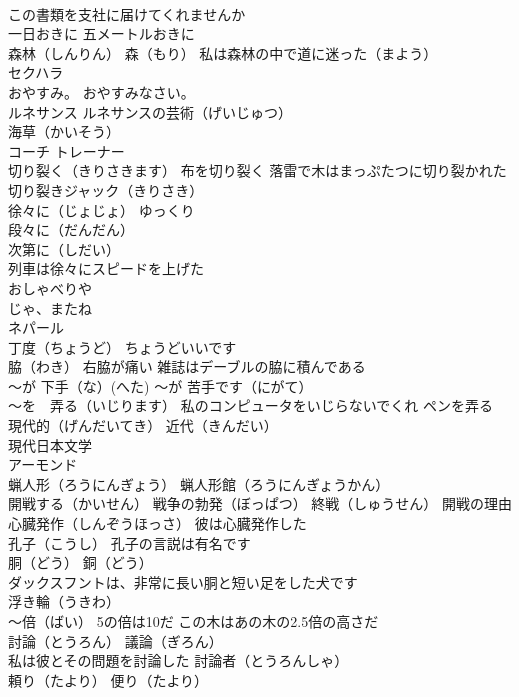 \documentclass[8pt]{extreport}
\begin{document}
\begin{CJK}{UTF8}{min}
\\	この書類を支社に届けてくれませんか
\\	一日おきに 五メートルおきに
\\	森林（しんりん） 森（もり） 私は森林の中で道に迷った（まよう）
\\	セクハラ
\\	おやすみ。 おやすみなさい。
\\	ルネサンス ルネサンスの芸術（げいじゅつ）
\\	海草（かいそう）
\\	コーチ トレーナー
\\	切り裂く（きりさきます） 布を切り裂く 落雷で木はまっぷたつに切り裂かれた 切り裂きジャック（きりさき）
\\	徐々に（じょじょ） ゆっくり　
\\	段々に（だんだん）
\\	次第に（しだい）
\\	列車は徐々にスピードを上げた
\\	おしゃべりや
\\	じゃ、またね
\\	ネパール
\\	丁度（ちょうど） ちょうどいいです
\\	脇（わき） 右脇が痛い 雑誌はデーブルの脇に積んである
\\	～が 下手（な）(へた) ～が 苦手です（にがて） 
\\	～を　弄る（いじります） 私のコンピュータをいじらないでくれ ペンを弄る
\\	現代的（げんだいてき） 近代（きんだい）
\\	現代日本文学
\\	アーモンド
\\	蝋人形（ろうにんぎょう） 蝋人形館（ろうにんぎょうかん）
\\	開戦する（かいせん） 戦争の勃発（ぼっぱつ） 終戦（しゅうせん） 開戦の理由
\\	心臓発作（しんぞうほっさ） 彼は心臓発作した
\\	孔子（こうし） 孔子の言説は有名です
\\	胴（どう） 銅（どう）
\\	ダックスフントは、非常に長い胴と短い足をした犬です
\\	浮き輪（うきわ）
\\	～倍（ばい） 5の倍は10だ この木はあの木の2.5倍の高さだ
\\	討論（とうろん） 議論（ぎろん）
\\	私は彼とその問題を討論した 討論者（とうろんしゃ）
\\	頼り（たより） 便り（たより）

\end{CJK}
\end{document}
